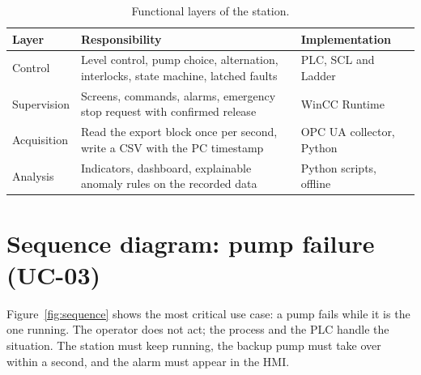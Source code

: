 \documentclass[11pt,a4paper]{report}
\begin{document}
	\begin{table}[H]\centering\small
		\begin{tabularx}{\linewidth}{|l|Y|l|}
			\hline
			Layer & Responsibility & Implementation \\
			\hline
			Control & Level control, pump choice, alternation, interlocks, state machine, latched faults & PLC, SCL and Ladder \\
			\hline
			Supervision & Screens, commands, alarms, emergency stop request with confirmed release & WinCC Runtime \\
			\hline
			Acquisition & Read the export block once per second, write a CSV with the PC timestamp & OPC UA collector, Python \\
			\hline
			Analysis & Indicators, dashboard, explainable anomaly rules on the recorded data & Python scripts, offline \\
			\hline
		\end{tabularx}
		\caption{Functional layers of the station.}\label{tab:layers}
	\end{table}
	
	\section{Sequence diagram: pump failure (UC-03)}
	
	Figure~\ref{fig:sequence} shows the most critical use case: a pump fails while it is the one running. The operator does not act; the process and the PLC handle the situation. The station must keep running, the backup pump must take over within a second, and the alarm must appear in the HMI.
	
\end{document}
